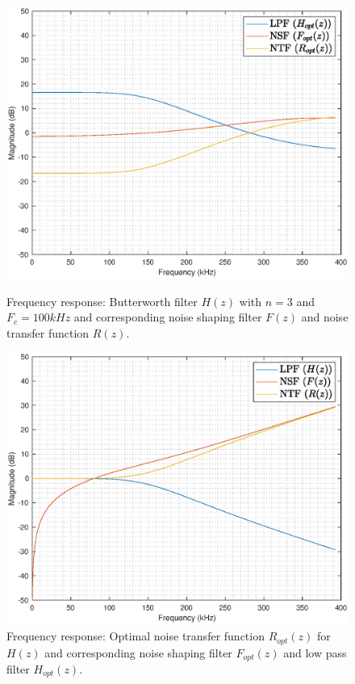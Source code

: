 \documentclass[a4paper]{article}
\begin{document}
\begin{figure}[!h]
	\centering
	\begin{minipage}{0.45\linewidth}
		\centering
		\includegraphics[scale = 0.45]{mat_plots/NO_butter_3_100khz_1Mhz_14_06_2024.eps}
		\caption{Frequency response: Butterworth filter $H(z)$ with $n = 3$ and $F_{c} = 100\mathit{kHz}$ and corresponding noise shaping filter $F(z)$ and noise transfer function $R(z)$.}
        \label{fig:nonoptimal_filter}
	\end{minipage}
	\hfil
	\begin{minipage}{0.45\linewidth}
		\centering
		\includegraphics[scale = 0.45]{mat_plots/O_butter_3_100khz_1Mhz_14_06_2024.eps}
		\caption{Frequency response: Optimal noise transfer function $R_{opt}(z)$ for $H(z)$ and corresponding noise shaping filter $F_{opt}(z)$ and low pass filter $H_{opt}(z)$.}
   \label{fig:optimal_filter}
	\end{minipage}
\end{figure}
\end{document}
